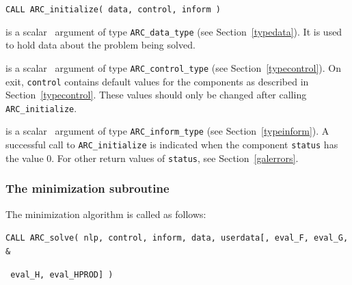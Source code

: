 \documentclass{galahad}
\newcommand{\packagename}{ARC}
\begin{document}
\hspace{8mm}
{\tt CALL \packagename\_initialize( data, control, inform )}

\vspace*{-3mm}
\begin{description}

 is a scalar \intentinout\ argument of type
{\tt \packagename\_data\_type}
(see Section~\ref{typedata}). It is used to hold data about the problem being
solved.

 is a scalar \intentout\ argument of type
{\tt \packagename\_control\_type}
(see Section~\ref{typecontrol}).
On exit, {\tt control} contains default values for the components as
described in Section~\ref{typecontrol}.
These values should only be changed after calling
{\tt \packagename\_initialize}.

 is a scalar \intentout\ argument of type
{\tt \packagename\_inform\_type}
(see Section~\ref{typeinform}). A successful call to
{\tt \packagename\_initialize}
is indicated when the  component {\tt status} has the value 0.
For other return values of {\tt status}, see Section~\ref{galerrors}.

\end{description}


\subsubsection{The minimization subroutine}
The minimization algorithm is called as follows:
\vspace*{1mm}

\hspace{8mm}
{\tt CALL \packagename\_solve( nlp, control, inform, data, userdata[, eval\_F,
eval\_G, \hspace{8mm}                  \&}
\vspace*{-1mm}

\hspace{37mm}
{\tt
eval\_H,  eval\_HPROD] )}
\end{document}
